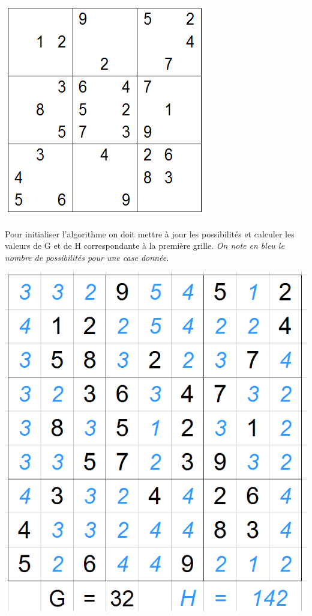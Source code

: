 \begin{center}
\includegraphics[scale=0.5]{images/AStarExample/ini.png}
\end{center}

Pour initialiser l'algorithme on doit mettre à jour les possibilités et calculer les valeurs de G et de H correspondante à la première grille. \textit{On note en bleu le nombre de possibilités pour une case donnée.}

\begin{center}
\includegraphics[scale=0.4]{images/AStarExample/ini_H.png}
\end{center}

